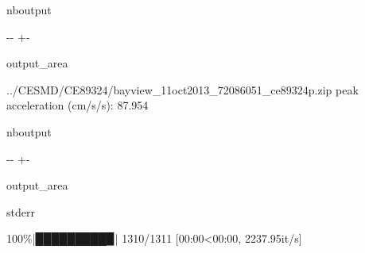 \documentclass[letterpaper,10pt,english]{sphinxmanual}
\begin{document}
\begin{sphinxuseclass}{nboutput}
{

\kern-\sphinxverbatimsmallskipamount\kern-\baselineskip
\kern+\FrameHeightAdjust\kern-\fboxrule
\vspace{\nbsphinxcodecellspacing}

\begin{sphinxuseclass}{output_area}
\begin{sphinxuseclass}{}


\begin{sphinxVerbatim}[commandchars=\\\{\}]
../CESMD/CE89324/bayview\_11oct2013\_72086051\_ce89324p.zip
peak acceleration (cm/s/s): 87.954
\end{sphinxVerbatim}



\end{sphinxuseclass}
\end{sphinxuseclass}
}

\end{sphinxuseclass}
\begin{sphinxuseclass}{nboutput}
{

\kern-\sphinxverbatimsmallskipamount\kern-\baselineskip
\kern+\FrameHeightAdjust\kern-\fboxrule
\vspace{\nbsphinxcodecellspacing}

\begin{sphinxuseclass}{output_area}
\begin{sphinxuseclass}{stderr}


\begin{sphinxVerbatim}[commandchars=\\\{\}]
100\%|█████████▉| 1310/1311 [00:00<00:00, 2237.95it/s]
\end{sphinxVerbatim}



\end{sphinxuseclass}
\end{sphinxuseclass}
}

\end{sphinxuseclass}
\end{document}
